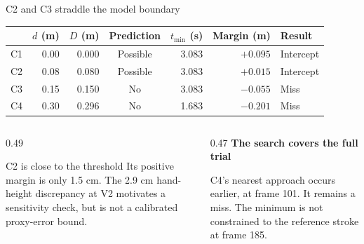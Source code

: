 \begin{frame}{C2 and C3 straddle the model boundary}
\centering
\begin{tabular}{@{}lrrcrrl@{}}\toprule
 & $d$ (m) & $D$ (m) & Prediction & $t_{\min}$ (s) & Margin (m) & Result\\\midrule
C1 & 0.00 & 0.000 & Possible & 3.083 & $+0.095$ & Intercept\\
C2 & 0.08 & 0.080 & Possible & 3.083 & $+0.015$ & Intercept\\
C3 & 0.15 & 0.150 & No & 3.083 & $-0.055$ & Miss\\
C4 & 0.30 & 0.296 & No & 1.683 & $-0.201$ & Miss\\\bottomrule
\end{tabular}\par
\par\medskip
\begin{columns}[T,onlytextwidth]
\begin{column}{0.49\textwidth}
\begin{tbox}{C2 is close to the threshold}
\small Its positive margin is only 1.5 cm. The 2.9 cm hand-height discrepancy at V2 motivates a sensitivity check, but is not a calibrated proxy-error bound.
\end{tbox}
\end{column}
\begin{column}{0.47\textwidth}
\textbf{The search covers the full trial}\par\par\smallskip
\small C4's nearest approach occurs earlier, at frame 101. It remains a miss. The minimum is not constrained to the reference stroke at frame 185.
\end{column}
\end{columns}
\end{frame}


